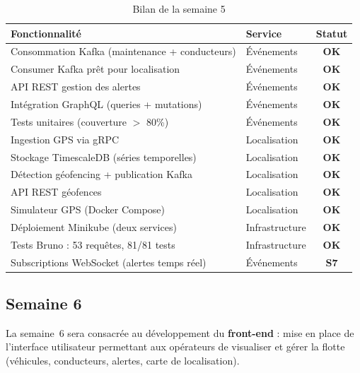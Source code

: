 \documentclass[12pt,a4paper]{article}
\begin{document}
\begin{table}[H]
\centering
\small
\begin{tabular}{|l|l|c|}
  \hline
  \rowcolor{primary!15}
  \textbf{Fonctionnalit\'{e}} & \textbf{Service} & \textbf{Statut} \\
  \hline
  Consommation Kafka (maintenance + conducteurs)  & \'{E}v\'{e}nements & \textcolor{success}{\textbf{OK}} \\
  Consumer Kafka pr\^{e}t pour localisation       & \'{E}v\'{e}nements & \textcolor{success}{\textbf{OK}} \\
  API REST gestion des alertes                    & \'{E}v\'{e}nements & \textcolor{success}{\textbf{OK}} \\
  Int\'{e}gration GraphQL (queries + mutations)   & \'{E}v\'{e}nements & \textcolor{success}{\textbf{OK}} \\
  Tests unitaires (couverture $>$ 80\%)           & \'{E}v\'{e}nements & \textcolor{success}{\textbf{OK}} \\
  Ingestion GPS via gRPC                          & Localisation      & \textcolor{success}{\textbf{OK}} \\
  Stockage TimescaleDB (s\'{e}ries temporelles)   & Localisation      & \textcolor{success}{\textbf{OK}} \\
  D\'{e}tection g\'{e}ofencing + publication Kafka & Localisation     & \textcolor{success}{\textbf{OK}} \\
  API REST g\'{e}ofences                          & Localisation      & \textcolor{success}{\textbf{OK}} \\
  Simulateur GPS (Docker Compose)                 & Localisation      & \textcolor{success}{\textbf{OK}} \\
  D\'{e}ploiement Minikube (deux services)        & Infrastructure    & \textcolor{success}{\textbf{OK}} \\
  Tests Bruno : 53 requ\^{e}tes, 81/81 tests      & Infrastructure    & \textcolor{success}{\textbf{OK}} \\
  Subscriptions WebSocket (alertes temps r\'{e}el) & \'{E}v\'{e}nements & \textcolor{warning}{\textbf{S7}} \\
  \hline
\end{tabular}
\caption{Bilan de la semaine 5}
\end{table}

\subsection{Semaine 6}

La semaine~6 sera consacr\'{e}e au d\'{e}veloppement du \textbf{front-end} : mise en place de l'interface utilisateur permettant aux op\'{e}rateurs de visualiser et g\'{e}rer la flotte (v\'{e}hicules, conducteurs, alertes, carte de localisation).
\end{document}
